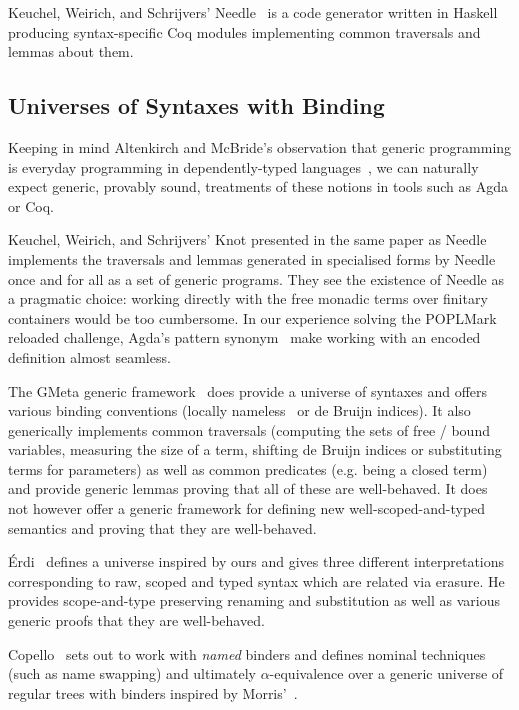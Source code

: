 Keuchel, Weirich, and Schrijvers' Needle~\cite{needleandknot} is a code
generator written in Haskell producing syntax-specific Coq modules
implementing common traversals and lemmas about them.

\subsection{Universes of Syntaxes with Binding} Keeping in mind Altenkirch
and McBride's observation that generic programming is everyday programming
in dependently-typed languages~\cite{genericprogramming-dtp}, we can naturally
expect generic, provably sound, treatments of these notions in tools such as
Agda or Coq.

Keuchel, Weirich, and Schrijvers' Knot presented in the same paper as
Needle~\cite{needleandknot} implements the traversals and lemmas generated
in specialised forms by Needle once and for all as a set of generic programs.
They see the existence of Needle as a pragmatic choice: working directly with
the free monadic terms over finitary containers would be too cumbersome. In
our experience solving the POPLMark reloaded challenge, Agda's pattern
synonym~\cite{Pickering:patsyn} make working with an encoded definition almost
seamless.

The GMeta generic framework~\cite{gmeta} does provide a universe of syntaxes
and offers various binding conventions (locally nameless~\cite{Charguéraud2012}
or de Bruijn indices). It also generically implements common traversals (computing
the sets of free / bound variables, measuring the size of a term, shifting
de Bruijn indices or substituting terms for parameters) as well as common
predicates (e.g. being a closed term) and provide generic lemmas proving that
all of these are well-behaved. It does not however offer a generic framework
for defining new well-scoped-and-typed semantics and proving that they are
well-behaved.

Érdi~\cite{gergodraft} defines a universe inspired by ours and gives three
different interpretations corresponding to raw, scoped and typed syntax
which are related via erasure. He provides scope-and-type preserving renaming
and substitution as well as various generic proofs that they are well-behaved.

Copello~\cite{copello2017} sets out to work with \emph{named} binders and
defines nominal techniques (such as name swapping) and ultimately $\alpha$-equivalence
over a generic universe of regular trees with binders inspired by Morris'~\cite{morris-regulartt}.







